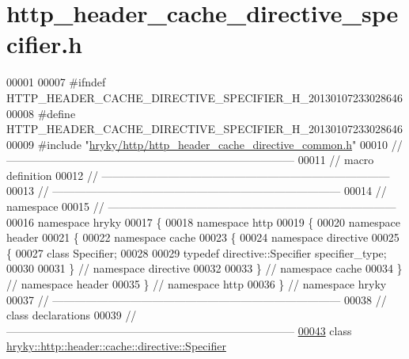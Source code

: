 \hypertarget{http__header__cache__directive__specifier_8h_source}{\section{http\-\_\-header\-\_\-cache\-\_\-directive\-\_\-specifier.\-h}
}

\begin{DoxyCode}
00001 
00007 \textcolor{preprocessor}{#ifndef HTTP\_HEADER\_CACHE\_DIRECTIVE\_SPECIFIER\_H\_20130107233028646}
00008 \textcolor{preprocessor}{}\textcolor{preprocessor}{#define HTTP\_HEADER\_CACHE\_DIRECTIVE\_SPECIFIER\_H\_20130107233028646}
00009 \textcolor{preprocessor}{}\textcolor{preprocessor}{#include "\hyperlink{http__header__cache__directive__common_8h}{hryky/http/http_header_cache_directive_common.h}"}
00010 \textcolor{comment}{//
      ------------------------------------------------------------------------------}
00011 \textcolor{comment}{// macro definition}
00012 \textcolor{comment}{//
      ------------------------------------------------------------------------------}
00013 \textcolor{comment}{//
      ------------------------------------------------------------------------------}
00014 \textcolor{comment}{// namespace}
00015 \textcolor{comment}{//
      ------------------------------------------------------------------------------}
00016 \textcolor{keyword}{namespace }hryky
00017 \{
00018 \textcolor{keyword}{namespace }http
00019 \{
00020 \textcolor{keyword}{namespace }header
00021 \{
00022 \textcolor{keyword}{namespace }cache
00023 \{
00024 \textcolor{keyword}{namespace }directive
00025 \{
00027     \textcolor{keyword}{class }Specifier;
00028 
00029 \textcolor{keyword}{typedef} directive::Specifier specifier\_type;
00030 
00031 \} \textcolor{comment}{// namespace directive}
00032 
00033 \} \textcolor{comment}{// namespace cache}
00034 \} \textcolor{comment}{// namespace header}
00035 \} \textcolor{comment}{// namespace http}
00036 \} \textcolor{comment}{// namespace hryky}
00037 \textcolor{comment}{//
      ------------------------------------------------------------------------------}
00038 \textcolor{comment}{// class declarations}
00039 \textcolor{comment}{//
      ------------------------------------------------------------------------------}
\hypertarget{http__header__cache__directive__specifier_8h_source_l00043}{}\hyperlink{classhryky_1_1http_1_1header_1_1cache_1_1directive_1_1_specifier}{00043} \textcolor{comment}{}\textcolor{keyword}{class }\hyperlink{classhryky_1_1http_1_1header_1_1cache_1_1directive_1_1_specifier}{hryky::http::header::cache::directive::Specifier}

\end{DoxyCode}
